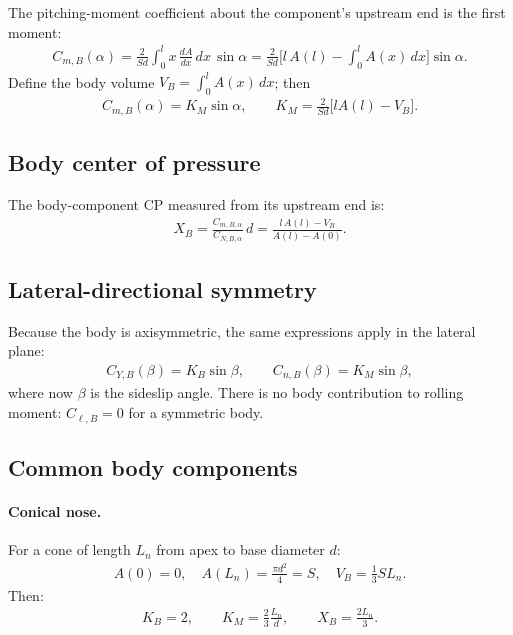 \documentclass[11pt]{article}
\begin{document}
The pitching-moment coefficient about the component's upstream end is the first moment:
\begin{align}
C_{m,B}(\alpha) = \frac{2}{Sd}\int_0^l x\,\frac{dA}{dx}\,dx\,\sin\alpha
= \frac{2}{Sd}\Big[l\,A(l) - \int_0^l A(x)\,dx\Big]\sin\alpha.
\end{align}
Define the body volume $V_B=\int_0^l A(x)\,dx$; then
\begin{align}
C_{m,B}(\alpha) = K_M\sin\alpha,\qquad K_M = \frac{2}{Sd}\big[lA(l)-V_B\big].
\end{align}

\subsection{Body center of pressure}
The body-component CP measured from its upstream end is:
\begin{align}
X_B = \frac{C_{m,B,\alpha}}{C_{N,B,\alpha}}\,d = \frac{l\,A(l)-V_B}{A(l)-A(0)}.
\end{align}

\subsection{Lateral-directional symmetry}
Because the body is axisymmetric, the same expressions apply in the lateral plane:
\begin{align}
C_{Y,B}(\beta) = K_B\sin\beta,\qquad
C_{n,B}(\beta) = K_M\sin\beta,
\end{align}
where now $\beta$ is the sideslip angle. There is no body contribution to rolling moment: $C_{\ell,B}=0$ for a symmetric body.

\subsection{Common body components}

\paragraph{Conical nose.}
For a cone of length $L_n$ from apex to base diameter $d$:
\begin{align}
A(0)=0,\quad A(L_n)=\frac{\pi d^2}{4}=S,\quad V_B = \frac{1}{3}S L_n.
\end{align}
Then:
\begin{align}
K_B = 2,\qquad K_M = \frac{2}{3}\frac{L_n}{d},\qquad X_B = \frac{2L_n}{3}.
\end{align}
\end{document}
